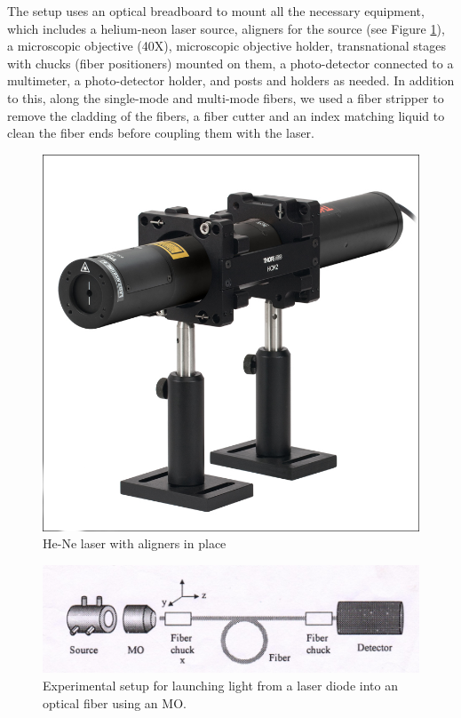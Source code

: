 \documentclass[%
 reprint,
nofootinbib,
 amsmath,amssymb,
 aps,
]{revtex4-2}
\begin{document}
The setup uses an optical breadboard to mount all the necessary equipment, which includes a helium-neon laser source, aligners for the source (see Figure \ref{fig:hene}), a microscopic objective (40X), microscopic objective holder, transnational stages with chucks (fiber positioners) mounted on them, a photo-detector connected to a multimeter, a photo-detector holder, and posts and holders as needed. In addition to this, along the single-mode and multi-mode fibers, we used a fiber stripper to remove the cladding of the fibers, a fiber cutter and an index matching liquid to clean the fiber ends before coupling them with the laser. 
\begin{figure}
	\centering
	\includegraphics[scale = 0.3, trim=4 4 4 4,clip]{mountedLaser}
	\caption{He-Ne laser with aligners in place}
	\label{fig:hene}
\end{figure}


\begin{figure}
	\centering
	\includegraphics[scale=0.65]{setup}
	\caption{Experimental setup for launching light from a laser diode into an optical fiber using an MO.}
	\label{fig:setup}
\end{figure}
\end{document}
